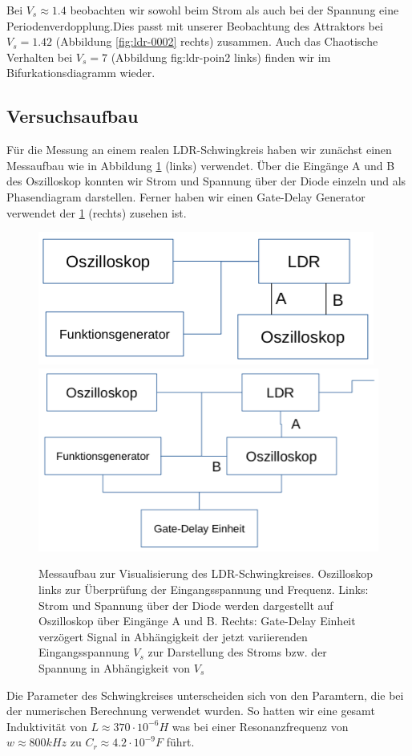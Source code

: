\documentclass{scrartcl}
\begin{document}
Bei $V_s\approx1.4$ beobachten wir sowohl beim Strom als auch bei der Spannung eine Periodenverdopplung.Dies passt mit unserer Beobachtung des Attraktors bei $V_s=1.42$ (Abbildung \ref{fig:ldr-0002} rechts) zusammen. Auch das Chaotische Verhalten bei $V_s=7$ (Abbildung fig:ldr-poin2 links) finden wir im Bifurkationsdiagramm wieder.

\subsection{ Versuchsaufbau}
Für die Messung an einem realen LDR-Schwingkreis haben wir zunächst einen Messaufbau wie in Abbildung \ref{fig:ldr-aufbau1} (links) verwendet. Über die Eingänge A und B des Oszilloskop konnten wir Strom und Spannung über der Diode einzeln und als Phasendiagram darstellen. Ferner haben wir einen Gate-Delay Generator verwendet der \ref{fig:ldr-aufbau1} (rechts) zusehen ist.
\begin{figure}[!htbp]
\includegraphics[scale=0.6]{aufbau1}
\includegraphics[scale=0.5]{aufbau2}
\caption{Messaufbau zur Visualisierung des LDR-Schwingkreises. Oszilloskop links zur Überprüfung der Eingangsspannung und Frequenz. Links: Strom und Spannung über der Diode werden dargestellt auf Oszilloskop über Eingänge A und B. Rechts: Gate-Delay Einheit verzögert Signal in Abhängigkeit der jetzt variierenden Eingangsspannung $V_s$ zur Darstellung des Stroms bzw. der Spannung in Abhängigkeit von $V_s$ }
\label{fig:ldr-aufbau1}
\end{figure}
Die Parameter des Schwingkreises unterscheiden sich von den Paramtern, die bei der numerischen Berechnung verwendet wurden. So hatten wir eine gesamt Induktivität von $L\approx370\cdot10^{-6}H$ was bei einer Resonanzfrequenz von $w\approx800kHz$ zu $C_r\approx4.2\cdot10^{-9}F$ führt.
\end{document}
